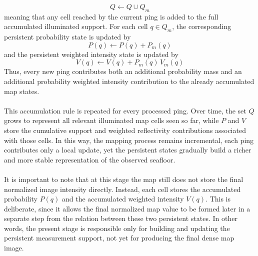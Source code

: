 \begin{equation}
    Q \leftarrow Q \cup Q_m
    \label{eq:local-map-generation-q-accumulation}
\end{equation}
meaning that any cell reached by the current ping is added to the full accumulated illuminated support. For each cell $q \in Q_m$, the corresponding persistent probability state is updated by
\begin{equation}
    P(q) \leftarrow P(q) + P_m(q)
    \label{eq:local-map-generation-p-accumulation}
\end{equation}
and the persistent weighted intensity state is updated by
\begin{equation}
    V(q) \leftarrow V(q) + P_m(q)\,V_m(q)
    \label{eq:local-map-generation-v-accumulation}
\end{equation}
Thus, every new ping contributes both an additional probability mass and an additional probability weighted intensity contribution to the already accumulated map states.
\\ \\
This accumulation rule is repeated for every processed ping. Over time, the set $Q$ grows to represent all relevant illuminated map cells seen so far, while $P$ and $V$ store the cumulative support and weighted reflectivity contributions associated with those cells. In this way, the mapping process remains incremental, each ping contributes only a local update, yet the persistent states gradually build a richer and more stable representation of the observed seafloor.
\\ \\
It is important to note that at this stage the map still does not store the final normalized image intensity directly. Instead, each cell stores the accumulated probability $P(q)$ and the accumulated weighted intensity $V(q)$. This is deliberate, since it allows the final normalized map value to be formed later in a separate step from the relation between these two persistent states. In other words, the present stage is responsible only for building and updating the persistent measurement support, not yet for producing the final dense map image.



